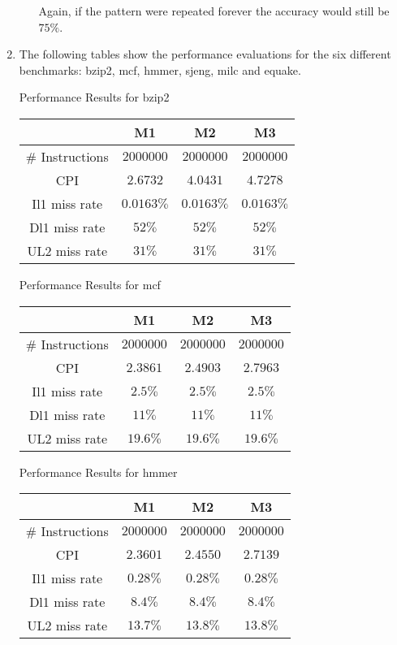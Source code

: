 \documentclass[10pt]{article} %
\begin{document}
\begin{enumerate}
\begin{enumerate}[(a)]
Again, if the pattern were repeated forever the accuracy would still be $75\%$.  

\end{enumerate}

\item %

The following tables show the performance evaluations for the six different benchmarks: bzip2, mcf, hmmer, sjeng, milc and equake.  

\begin{center}
Performance Results for bzip2

\begin{tabular}{|c|c|c|c|}
\hline
 & M1 & M2 & M3 \\
\hline
\# Instructions & $2000000$ & $2000000$ & $2000000$ \\
CPI & $2.6732$ & $4.0431$ & $4.7278$ \\
Il1 miss rate & $0.0163\%$ & $0.0163\%$ & $0.0163\%$ \\
Dl1 miss rate & $52\%$ & $52\%$ & $52\%$ \\
UL2 miss rate & $31\%$ & $31\%$ & $31\%$ \\
\hline
\end{tabular}
\end{center}

\begin{center}
Performance Results for mcf

\begin{tabular}{|c|c|c|c|}
\hline
 & M1 & M2 & M3 \\
\hline
\# Instructions & $2000000$ & $2000000$ & $2000000$ \\
CPI & $2.3861$ & $2.4903$ & $2.7963$ \\
Il1 miss rate & $2.5\%$ & $2.5\%$ & $2.5\%$ \\
Dl1 miss rate & $11\%$ & $11\%$ & $11\%$ \\
UL2 miss rate & $19.6\%$ & $19.6\%$ & $19.6\%$ \\
\hline
\end{tabular}
\end{center}

\begin{center}
Performance Results for hmmer

\begin{tabular}{|c|c|c|c|}
\hline
 & M1 & M2 & M3 \\
\hline
\# Instructions & $2000000$ & $2000000$ & $2000000$ \\
CPI & $2.3601$ & $2.4550$ & $2.7139$ \\
Il1 miss rate & $0.28\%$ & $0.28\%$ & $0.28\%$ \\
Dl1 miss rate & $8.4\%$ & $8.4\%$ & $8.4\%$ \\
UL2 miss rate & $13.7\%$ & $13.8\%$ & $13.8\%$ \\
\hline
\end{tabular}
\end{center}


\end{enumerate}
\end{document}
